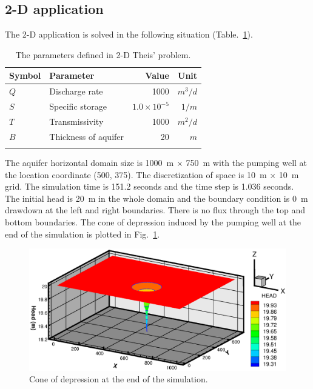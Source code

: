 \subsection{2-D application}
%
The 2-D application is solved in the following situation (Table.~\ref{2dTheis}).\\
%
\begin{table}[htb]
\centering
\caption{The parameters defined in 2-D Theis' problem.}
\begin{tabular*}{0.9\textwidth}{@{\extracolsep{\fill}}llrr}
\hline\noalign{\smallskip}
{Symbol}&{Parameter} & {Value} & {Unit} \\ 
\hline\noalign{\smallskip}
 $Q$ & Discharge rate       &  1000  				        & $m^{3}/d$  \\
 $S$ & Specific storage     &  $1.0\times 10^{-5}$	& $1/m$ \\
 $T$ &  Transmissivity      & 1000 				        & $m^{2}/d$ \\
 $B$ & Thickness of aquifer &  20 					        & $m$ \\
  \noalign{\smallskip}\hline
\end{tabular*}
\label{2dTheis}
\end{table}

The aquifer horizontal domain size is 1000~m $\times$ 750~m with the pumping well at the location coordinate (500, 375). The discretization of space is 10~m $\times$ 10~m grid. The simulation time is 151.2 seconds and the time step is 1.036 seconds. The initial head is 20~m in the whole domain and the boundary condition is 0~m drawdown at the left and right boundaries. There is no flux through the top and bottom boundaries. The cone of depression induced by the pumping well at the end of the simulation is plotted in Fig.~\ref{theis2}.

\begin{figure} [htb]
 \centering
 \vspace{-40pt}
 \includegraphics[width=1.0\columnwidth] {Chapter5/figure/Theis2.eps}
 \vspace{-50pt}
 \caption{Cone of depression at the end of the simulation.}
 \vspace{-20pt}
 \label{theis2}
\end{figure}